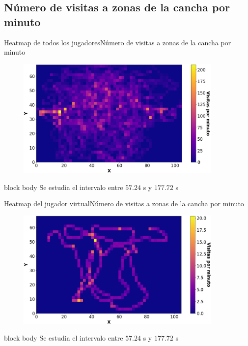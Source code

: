 \documentclass{beamer}
\begin{document}
        \subsection{Número de visitas a zonas de la cancha por minuto}

            \begin{frame}{Heatmap de todos los jugadores}{Número de visitas a zonas de la cancha por minuto}
                \begin{figure}[H!]
                    \includegraphics[width=0.9\textwidth]{./heatmap_all}
                    \label{fig:futbol_11}
                \end{figure}
                \begin{beamercolorbox}[sep=5pt,center]{block body}
                    \centering
                    \small{Se estudia el intervalo entre $57.24$ s y $177.72$ s}
                \end{beamercolorbox}
            \end{frame}

            \begin{frame}{Heatmap del jugador virtual}{Número de visitas a zonas de la cancha por minuto}
                \begin{figure}[H!]
                    \includegraphics[width=0.9\textwidth]{./heatmap_loco}
                    \label{fig:futbol_12}
                \end{figure}
                \begin{beamercolorbox}[sep=5pt,center]{block body}
                    \centering
                    \small{Se estudia el intervalo entre $57.24$ s y $177.72$ s}
                \end{beamercolorbox}
            \end{frame}
\end{document}

